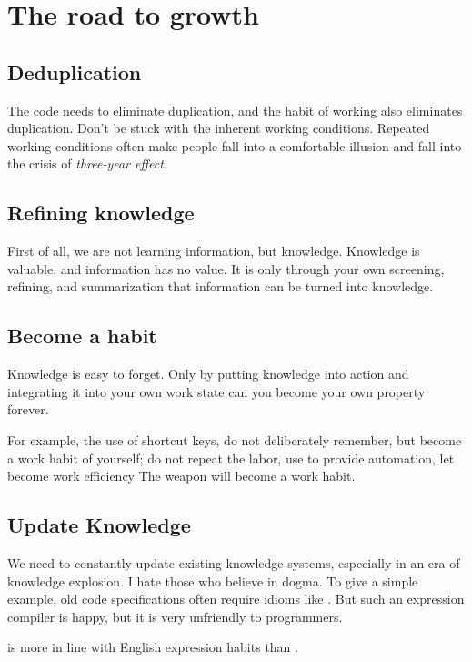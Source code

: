 \section{The road to growth}
\begin{content}


\subsection{Deduplication}
The code needs to eliminate duplication, and the habit of working also eliminates duplication. Don't be stuck with the inherent working conditions. Repeated working conditions often make people fall into a comfortable illusion and fall into the crisis of \emph{three-year effect}.


\subsection{Refining knowledge}
First of all, we are not learning information, but knowledge. Knowledge is valuable, and information has no value. It is only through your own screening, refining, and summarization that information can be turned into knowledge.


\subsection{Become a habit}
Knowledge is easy to forget. Only by putting knowledge into action and integrating it into your own work state can you become your own property forever.

For example, the use of shortcut keys, do not deliberately remember, but become a work habit of yourself; do not repeat the labor, use  to provide automation, let  become work efficiency The weapon will become a work habit.


\subsection{Update Knowledge}
We need to constantly update existing knowledge systems, especially in an era of knowledge explosion. I hate those who believe in dogma. To give a simple example, old code specifications often require  idioms like . But such an expression compiler is happy, but it is very unfriendly to programmers.

 is more in line with English expression habits than .


\end{content}
